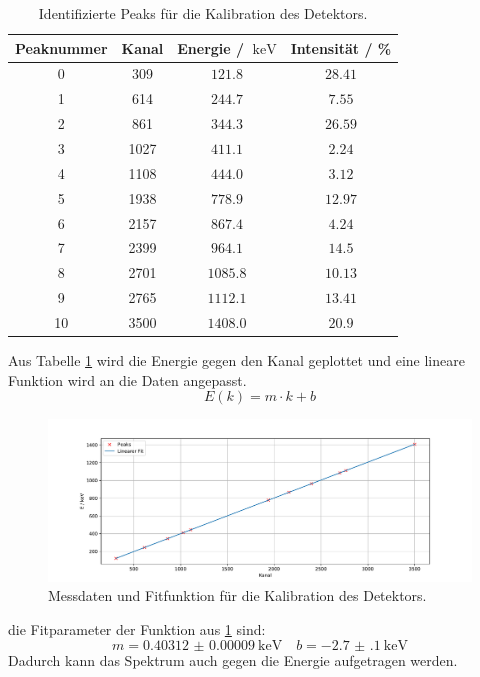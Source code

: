 \begin{table}
  \centering
  \caption{Identifizierte Peaks für die Kalibration des Detektors.}
  \label{tab:peaks_01}
  \begin{tabular}{c c c c}
    \toprule
    Peaknummer&Kanal&Energie / $\SI{}{\kilo\eV}$&Intensität / \%\\
    \midrule
    0  &309   &$\num{121.8}$&$\num{28.41}$\\
    1   &614   &$\num{244.7}$&$\num{7.55}$\\
    2   &861   &$\num{344.3}$&$\num{26.59}$\\
    3   &1027  &$\num{411.1}$&$\num{2.24}$\\
    4   &1108  &$\num{444.0}$&$\num{3.12}$\\
    5   &1938  &$\num{778.9}$&$\num{12.97}$\\
    6   &2157  &$\num{867.4}$&$\num{4.24}$\\
    7   &2399  &$\num{964.1}$&$\num{14.5}$\\
    8   &2701  &$\num{1085.8}$&$\num{10.13}$\\
    9  &2765  &$\num{1112.1}$&$\num{13.41}$\\
    10  &3500  &$\num{1408.0}$&$\num{20.9}$\\
    \bottomrule
  \end{tabular}
\end{table}
Aus Tabelle \ref{tab:peaks_01} wird die Energie gegen den Kanal geplottet und eine lineare Funktion wird an die Daten 
angepasst.
\begin{equation*}
  \label{eq:linear}
  E(k) = m\cdot k + b
\end{equation*}
\FloatBarrier
\begin{figure}
  \centering
  \includegraphics[width=\textwidth,keepaspectratio]{figure/Lin_Fit_01.pdf}
  \caption{Messdaten und Fitfunktion für die Kalibration des Detektors.}
  \label{fig:Lin_Fit:01}
\end{figure}
\FloatBarrier
die Fitparameter der Funktion aus \ref{fig:Lin_Fit:01} sind:
\begin{equation*}
  m = \SI{0.40312(9)}{\kilo\eV} \quad b = \SI{-2.7(1)}{\kilo\eV}
\end{equation*}
Dadurch kann das Spektrum auch gegen die Energie aufgetragen werden.
